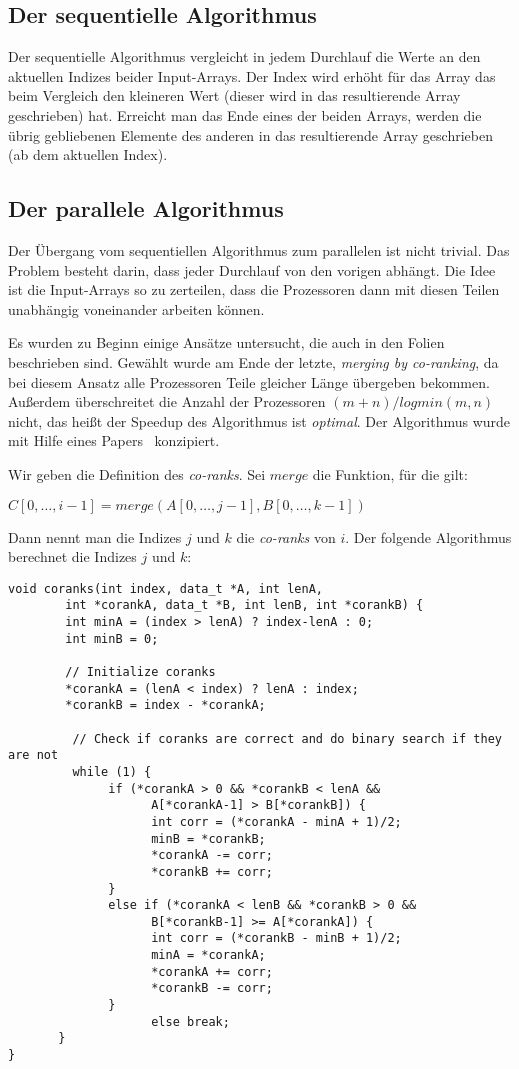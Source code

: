 \subsection{Der sequentielle Algorithmus}
Der sequentielle Algorithmus vergleicht in jedem Durchlauf die Werte an den aktuellen Indizes beider Input-Arrays. Der Index wird erhöht für das Array das beim Vergleich den kleineren Wert (dieser wird in das resultierende Array geschrieben) hat. Erreicht man das Ende eines der beiden Arrays, werden die übrig gebliebenen Elemente des anderen in das resultierende Array geschrieben (ab dem aktuellen Index).

\subsection{Der parallele Algorithmus}
Der Übergang vom sequentiellen Algorithmus zum parallelen ist nicht trivial. Das Problem besteht darin, dass jeder Durchlauf von den vorigen abhängt. Die Idee ist die Input-Arrays so zu zerteilen, dass die Prozessoren dann mit diesen Teilen unabhängig voneinander arbeiten können.

Es wurden zu Beginn einige Ansätze untersucht, die auch in den Folien beschrieben sind. Gewählt wurde am Ende der letzte, \emph{merging by co-ranking}, da bei diesem Ansatz alle Prozessoren Teile gleicher Länge übergeben bekommen. Außerdem überschreitet die Anzahl der Prozessoren $(m+n) / log min(m,n)$ nicht, das heißt der Speedup des Algorithmus ist \emph{optimal}. Der Algorithmus wurde mit Hilfe eines Papers~\cite{corank} konzipiert.

Wir geben die Definition des \emph{co-ranks}. Sei $merge$ die Funktion, für die gilt:
\begin{center}
$C[0,\dots,i-1] = merge(A[0,\dots,j-1], B[0,\dots,k-1])$
\end{center}
Dann nennt man die Indizes $j$ und $k$ die \emph{co-ranks} von $i$. Der folgende Algorithmus berechnet die Indizes $j$ und $k$:
\begin{verbatim}
void coranks(int index, data_t *A, int lenA, 
        int *corankA, data_t *B, int lenB, int *corankB) {
        int minA = (index > lenA) ? index-lenA : 0;
        int minB = 0;

        // Initialize coranks
        *corankA = (lenA < index) ? lenA : index;
        *corankB = index - *corankA;

         // Check if coranks are correct and do binary search if they are not
         while (1) {
              if (*corankA > 0 && *corankB < lenA && 
                    A[*corankA-1] > B[*corankB]) {
                    int corr = (*corankA - minA + 1)/2;
                    minB = *corankB;
                    *corankA -= corr;
                    *corankB += corr;
              }
              else if (*corankA < lenB && *corankB > 0 && 
                    B[*corankB-1] >= A[*corankA]) {
                    int corr = (*corankB - minB + 1)/2;
                    minA = *corankA;
                    *corankA += corr;
                    *corankB -= corr;
              }
                    else break;
       }
}
\end{verbatim}